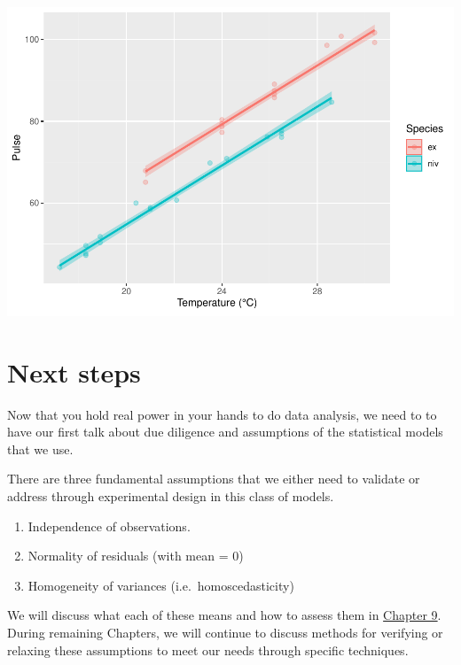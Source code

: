 \documentclass[
]{book}
\providecommand{\tightlist}{%
  \setlength{\itemsep}{0pt}\setlength{\parskip}{0pt}}
\begin{document}
\includegraphics{worstr_files/figure-latex/unnamed-chunk-213-1.pdf}

\hypertarget{next7}{%
\section{Next steps}\label{next7}}

Now that you hold real power in your hands to do data analysis, we need to to have our first talk about due diligence and assumptions of the statistical models that we use.

There are three fundamental assumptions that we either need to validate or address through experimental design in this class of models.

\begin{enumerate}
\def\labelenumi{\arabic{enumi}.}
\tightlist
\item
  Independence of observations.
\item
  Normality of residuals (with mean = 0)
\item
  Homogeneity of variances (i.e.~homoscedasticity)
\end{enumerate}

We will discuss what each of these means and how to assess them in \protect\hyperlink{Chapter9}{Chapter 9}. During remaining Chapters, we will continue to discuss methods for verifying or relaxing these assumptions to meet our needs through specific techniques.

  
\end{document}
